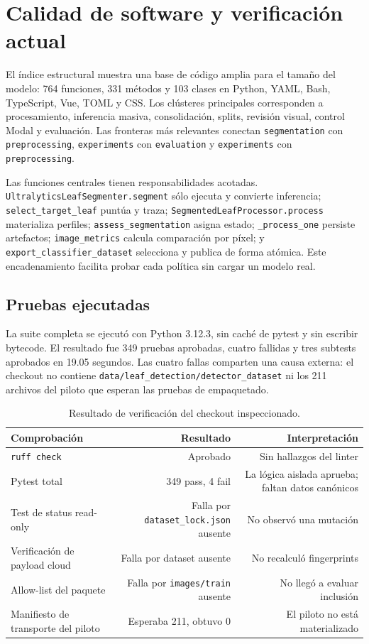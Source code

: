 \documentclass[11pt,a4paper]{article}
\begin{document}
\section{Calidad de software y verificación actual}

El índice estructural muestra una base de código amplia para el tamaño del modelo: 764 funciones, 331 métodos y 103 clases en Python, YAML, Bash, TypeScript, Vue, TOML y CSS. Los clústeres principales corresponden a procesamiento, inferencia masiva, consolidación, splits, revisión visual, control Modal y evaluación. Las fronteras más relevantes conectan \texttt{segmentation} con \texttt{preprocessing}, \texttt{experiments} con \texttt{evaluation} y \texttt{experiments} con \texttt{preprocessing}.


Las funciones centrales tienen responsabilidades acotadas. \texttt{UltralyticsLeafSegmenter.segment} sólo ejecuta y convierte inferencia; \texttt{select\_target\_leaf} puntúa y traza; \texttt{SegmentedLeafProcessor.process} materializa perfiles; \texttt{assess\_segmentation} asigna estado; \texttt{\_process\_one} persiste artefactos; \texttt{image\_metrics} calcula comparación por píxel; y \texttt{export\_classifier\_dataset} selecciona y publica de forma atómica. Este encadenamiento facilita probar cada política sin cargar un modelo real.


\subsection{Pruebas ejecutadas}

La suite completa se ejecutó con Python 3.12.3, sin caché de pytest y sin escribir bytecode. El resultado fue 349 pruebas aprobadas, cuatro fallidas y tres subtests aprobados en 19.05 segundos. Las cuatro fallas comparten una causa externa: el checkout no contiene \texttt{data/leaf\_detection/detector\_dataset} ni los 211 archivos del piloto que esperan las pruebas de empaquetado.


\begin{table}[H]
\centering
\caption{Resultado de verificación del checkout inspeccionado.}
\small
\begin{tabular}{lrr}
\toprule
Comprobación & Resultado & Interpretación \\
\midrule
\texttt{ruff check} & Aprobado & Sin hallazgos del linter \\
Pytest total & 349 pass, 4 fail & La lógica aislada aprueba; faltan datos canónicos \\
Test de status read-only & Falla por \texttt{dataset\_lock.json} ausente & No observó una mutación \\
Verificación de payload cloud & Falla por dataset ausente & No recalculó fingerprints \\
Allow-list del paquete & Falla por \texttt{images/train} ausente & No llegó a evaluar inclusión \\
Manifiesto de transporte del piloto & Esperaba 211, obtuvo 0 & El piloto no está materializado \\
\bottomrule
\end{tabular}
\end{table}
\end{document}
